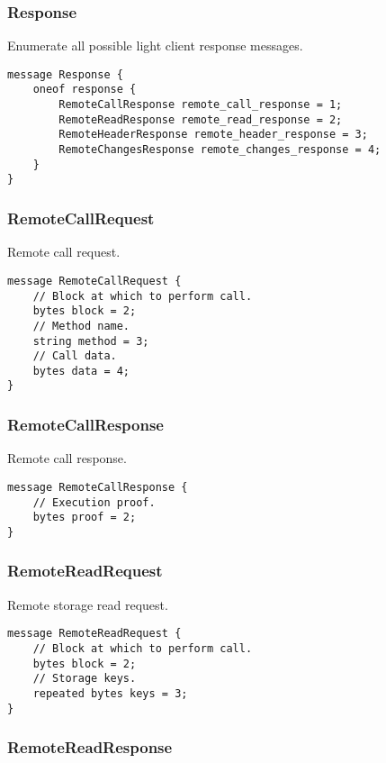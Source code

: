 \documentclass{book}
\begin{document}
\subsubsection{Response}

Enumerate all possible light client response messages.

\begin{lstlisting}[frame=single]
message Response {
    oneof response {
        RemoteCallResponse remote_call_response = 1;
        RemoteReadResponse remote_read_response = 2;
        RemoteHeaderResponse remote_header_response = 3;
        RemoteChangesResponse remote_changes_response = 4;
    }
}
\end{lstlisting}

\subsubsection{RemoteCallRequest}

Remote call request.

\begin{lstlisting}[frame=single]
message RemoteCallRequest {
    // Block at which to perform call.
    bytes block = 2;
    // Method name.
    string method = 3;
    // Call data.
    bytes data = 4;
}
\end{lstlisting}

\subsubsection{RemoteCallResponse}

Remote call response.

\begin{lstlisting}[frame=single]
message RemoteCallResponse {
    // Execution proof.
    bytes proof = 2;
}
\end{lstlisting}

\subsubsection{RemoteReadRequest}

Remote storage read request.

\begin{lstlisting}[frame=single]
message RemoteReadRequest {
    // Block at which to perform call.
    bytes block = 2;
    // Storage keys.
    repeated bytes keys = 3;
}
\end{lstlisting}

\subsubsection{RemoteReadResponse}
\end{document}
